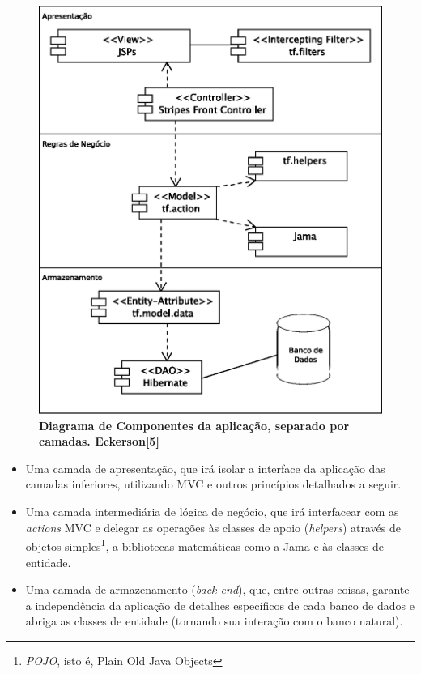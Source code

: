 \documentclass{abnt}
\begin{document}
\begin{figure}
\begin{center}
\includegraphics[scale=0.8]{deployment.eps}
\caption{{\bf Diagrama de Componentes da aplicação, separado por camadas. Eckerson[5]}}
\label{deployment}
\end{center}
\end{figure}


\begin{itemize}
\item Uma camada de apresentação, que irá isolar a interface da aplicação das camadas inferiores, utilizando MVC e outros princípios detalhados a seguir.

\item Uma camada intermediária de lógica de negócio, que irá interfacear com as \textit{actions} MVC e delegar as operações às classes de apoio (\textit{helpers}) através de objetos simples\footnote{\textit{POJO}, isto é, Plain Old Java Objects}, a bibliotecas matemáticas como a Jama e às classes de entidade.

\item Uma camada de armazenamento (\textit{back-end}), que, entre outras coisas, garante a independência da aplicação de detalhes específicos de cada banco de dados e abriga as classes de entidade (tornando sua interação com o banco natural).

\end{itemize}
\end{document}
